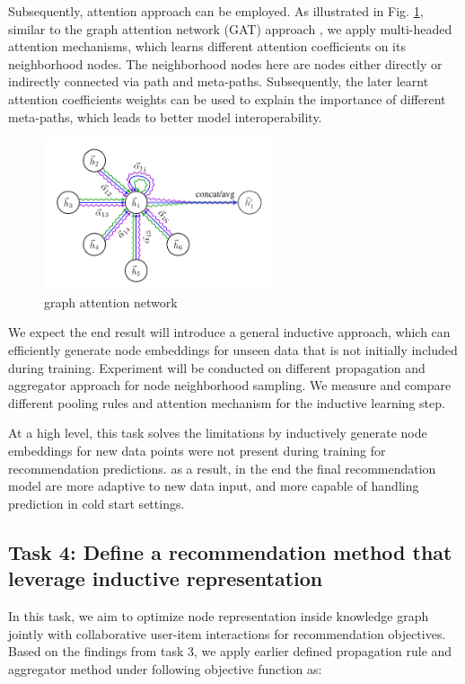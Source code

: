 Subsequently, attention approach can be employed. As illustrated in Fig. \ref{fig:gat}, similar to the graph attention network (GAT) approach \citep{velivckovic2017graph}, we apply multi-headed attention mechanisms, which learns different attention coefficients on its neighborhood nodes. The neighborhood nodes here are nodes either directly or indirectly connected via path and meta-paths. Subsequently, the later learnt attention coefficients weights can be used to explain the importance of different meta-paths, which leads to better model interoperability.

\begin{figure}[!ht]
    \centering
    \includegraphics[width=0.6\textwidth]{figs/gat.png}
    \caption{graph attention network}\label{fig:gat}
\end{figure}

We expect the end result will introduce a general inductive approach, which can efficiently generate node embeddings for unseen data that is not initially included during training.
Experiment will be conducted on different propagation and aggregator approach for node neighborhood sampling. We measure and compare different pooling rules and attention mechanism for the inductive learning step.

At a high level, this task solves the limitations by inductively generate node embeddings for new data points were not present during training for recommendation predictions. as a result, in the end the final recommendation model are more adaptive to new data input, and more capable of handling prediction in cold start settings.


\subsection*{Task 4: Define a recommendation method that leverage inductive representation}
In this task, we aim to optimize node representation inside knowledge graph jointly with collaborative user-item interactions for recommendation objectives.
Based on the findings from task 3, we apply earlier defined propagation rule and aggregator method under following objective function as:

